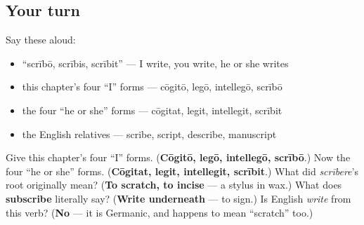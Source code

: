 \subsection*{Your turn}
Say these aloud:

\begin{itemize}
\raggedright
  \item \textquotedblleft{}scrībō, scrībis, scrībit\textquotedblright{} — I write, you write, he or she writes
  \item this chapter's four \textquotedblleft{}I\textquotedblright{} forms — cōgitō, legō, intellegō, scrībō
  \item the four \textquotedblleft{}he or she\textquotedblright{} forms — cōgitat, legit, intellegit, scrībit
  \item the English relatives — scribe, script, describe, manuscript
\end{itemize}

\begin{tcolorbox}[breakable,colback=teal!4,colframe=teal!35!black,title={Before you move on}]
Give this chapter's four \textquotedblleft{}I\textquotedblright{} forms. (\textbf{Cōgitō, legō, intellegō, scrībō}.) Now the four \textquotedblleft{}he or she\textquotedblright{} forms. (\textbf{Cōgitat, legit, intellegit, scrībit}.) What did \emph{scrībere}'s root originally mean? (\textbf{To scratch, to incise} — a stylus in wax.) What does \textbf{subscribe} literally say? (\textbf{Write underneath} — to sign.) Is English \emph{write} from this verb? (\textbf{No} — it is Germanic, and happens to mean \textquotedblleft{}scratch\textquotedblright{} too.)
\end{tcolorbox}

